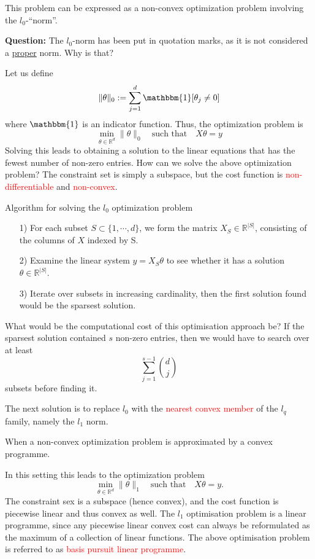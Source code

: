 \documentclass[10pt,handout,english]{beamer}
\newcommand{\R}{\mathbb{R}}
\begin{document}
\begin{frame}[allowframebreaks]
This problem can be expressed as  a non-convex optimization problem involving the $l_0$-\textquotedblleft norm\textquotedblright. 

\textbf{Question:} The $l_0$-norm has been put in quotation marks, as it is not considered a \underline{proper} norm. Why is that?

Let us define
\[
\lVert \theta\rVert_0:=\sum\limits_{j=1}^{d}\mathbbm{1}[\theta_j\neq 0]
\] 
where $\mathbbm{1}$ is an indicator function. Thus, the optimization problem is
\[
\min_{\theta\in\R^d}\lVert \theta\rVert_0\quad\text{such that}\quad X\theta=y
\]
Solving this leads to obtaining a solution to the linear equations that has the fewest number of non-zero entries. How can we solve the above optimization problem? The constraint set is simply a subspace, but the cost function is \textcolor{red}{non-differentiable} and \textcolor{red}{non-convex}.
\end{frame}
\begin{frame}[allowframebreaks]
\begin{block}{Algorithm for solving the $l_0$ optimization problem}
\begin{enumerate}
\item[1)]  For each subset $S\subset \{1,\cdots,d\}$, we form the matrix $X_{S}\in\R^{\lvert S\rvert}$, consisting of the columns of $X$ indexed by S.
\item[2)] Examine the linear system $y=X_S\theta$ to see whether it has a solution $\theta\in\R^{\lvert S\rvert}$.
\item[3)] Iterate over subsets in increasing cardinality, then the first solution found would be the sparsest solution.
\end{enumerate}
\end{block}

What would be the computational cost of this optimisation approach be? If the sparsest solution contained $s$ non-zero entries, then we would have to search over at least 
\[
\sum\limits_{j=1}^{s-1}\binom{d}{j}
\]
subsets before finding it.

The next solution is to replace $l_0$ with the \textcolor{red}{nearest convex member} of the $l_q$ family, namely the $l_1$ norm. 
\begin{definition}
When a non-convex optimization problem is approximated by a convex programme.
\end{definition}
In this setting this leads to the optimization problem
\[
\min_{\theta\in\R^d}\lVert \theta\rVert_1\quad\text{such that}\quad X\theta=y.
\]
The constraint sex is a subspace (hence convex), and the cost function is piecewise linear and thus convex as well. The $l_1$ optimisation problem is a linear programme, since any piecewise linear convex cost can always be reformulated as the maximum of a collection of linear functions. The above optimisation problem is referred to as \textcolor{red}{basis pursuit linear programme}.
\end{frame}
\end{document}
